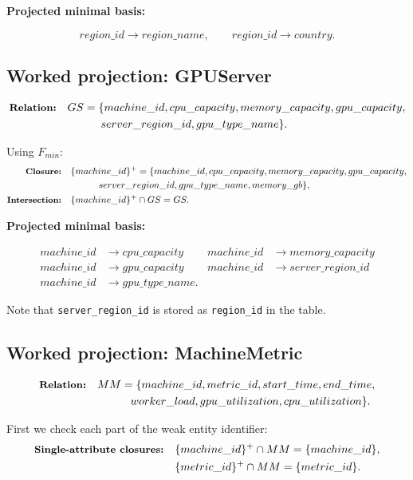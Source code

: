 \documentclass[11pt]{article}
\newcommand{\fd}{\rightarrow}
\newcommand{\code}[1]{\texttt{#1}}
\newcommand{\projlabel}[1]{\text{\small\bfseries #1}}
\begin{document}
\begin{center}
    \textbf{Projected minimal basis:}
\end{center}
\[
region\_id \fd region\_name,
\qquad
region\_id \fd country.
\]

\subsection{Worked projection: GPUServer}

\begin{align*}
\projlabel{Relation:} &\quad GS = \{machine\_id, cpu\_capacity, memory\_capacity, gpu\_capacity,\\
&\qquad\qquad server\_region\_id, gpu\_type\_name\}.
\end{align*}

Using $F_{min}$:
\begin{align*}
\projlabel{Closure:} &\quad \{machine\_id\}^{+}
= \{machine\_id, cpu\_capacity, memory\_capacity, gpu\_capacity,\\
&\qquad\qquad server\_region\_id, gpu\_type\_name, memory\_gb\},\\
\projlabel{Intersection:} &\quad \{machine\_id\}^{+} \cap GS = GS.
\end{align*}

\begin{center}
    \textbf{Projected minimal basis:}
\end{center}
\begin{align*}
machine\_id &\fd cpu\_capacity &
 machine\_id &\fd memory\_capacity\\
machine\_id &\fd gpu\_capacity &
 machine\_id &\fd server\_region\_id\\
machine\_id &\fd gpu\_type\_name.&&
\end{align*}

Note that \code{server\_region\_id} is stored as \code{region\_id} in the table.

\subsection{Worked projection: MachineMetric}

\begin{align*}
\projlabel{Relation:} &\quad MM = \{machine\_id, metric\_id, start\_time, end\_time,\\
&\qquad\qquad worker\_load, gpu\_utilization, cpu\_utilization\}.
\end{align*}

First we check each part of the weak entity identifier:
\begin{align*}
\projlabel{Single-attribute closures:} &\quad
\{machine\_id\}^{+} \cap MM = \{machine\_id\},\\
&\quad \{metric\_id\}^{+} \cap MM = \{metric\_id\}.
\end{align*}
\end{document}
